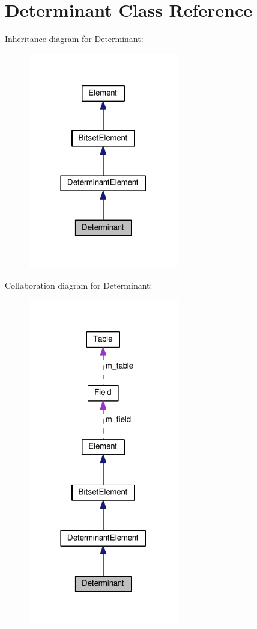 \hypertarget{classDeterminant}{}\section{Determinant Class Reference}
\label{classDeterminant}


Inheritance diagram for Determinant\+:
\nopagebreak
\begin{figure}[H]
\begin{center}
\leavevmode
\includegraphics[width=186pt]{classDeterminant__inherit__graph}
\end{center}
\end{figure}


Collaboration diagram for Determinant\+:
\nopagebreak
\begin{figure}[H]
\begin{center}
\leavevmode
\includegraphics[width=186pt]{classDeterminant__coll__graph}
\end{center}
\end{figure}
